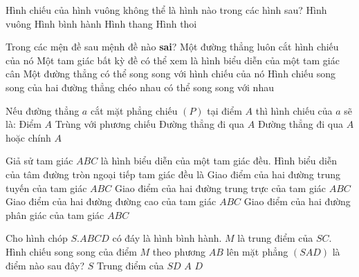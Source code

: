 \begin{ex}%
	Hình chiếu của hình vuông không thể là hình nào trong các hình sau?
	\choice
		{Hình vuông}
		{Hình bình hành}
		{\True Hình thang}
		{Hình thoi}
\end{ex}
\begin{ex}%
	Trong các mện đề sau mệnh đề nào \textbf{sai}?
	\choice
		{\True Một đường thẳng luôn cắt hình chiếu của nó}
		{Một tam giác bất kỳ đề có thể xem là hình biểu diễn của một tam giác cân}
		{Một đường thẳng có thể song song với hình chiếu của nó}
		{Hình chiếu song song của hai đường thẳng chéo nhau có thể song song với nhau}
\end{ex}
\begin{ex}%
	Nếu đường thẳng $a$ cắt mặt phẳng chiếu $\left( P \right)$ tại điểm $A$ thì hình chiếu của $a$ sẽ là:
	\choice
		{Điểm $A$}
		{Trùng với phương chiếu}
		{Đường thẳng đi qua $A$}
		{\True Đường thẳng đi qua $A$ hoặc chính $A$}
\end{ex}
\begin{ex}%
	Giả sử tam giác $ABC$ là hình biểu diễn của một tam giác đều. Hình biểu diễn của tâm đường tròn ngoại tiếp tam giác đều là
	\choice
		{Giao điểm của hai đường trung tuyến của tam giác $ABC$}
		{\True Giao điểm của hai đường trung trực của tam giác $ABC$}
		{Giao điểm của hai đường đường cao của tam giác $ABC$}
		{Giao điểm của hai đường phân giác của tam giác $ABC$}
\end{ex}
\begin{ex}%
	Cho hình chóp $S.ABCD$ có đáy là hình bình hành. $M$ là trung điểm của $SC$. Hình chiếu song song của điểm $M$ theo phương $AB$ lên mặt phẳng $\left( SAD \right)$ là điểm nào sau đây?
	\choice
		{$S$}
		{\True Trung điểm của $SD$}
		{$A$}
		{$D$}
\end{ex}
